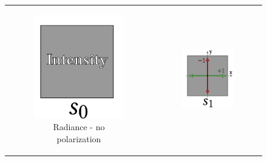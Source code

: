 \renewcommand\thesubfigure{\arabic{subfigure}}
\begin{figure}
	\centering
	\begin{tabular}{cc}
		\begin{subfigure}
			{0.4\textwidth}\centering\includegraphics[width=\linewidth]{img/stokes1.png}
			\caption{Radiance - no polarization}
		\end{subfigure}
		&
		\begin{subfigure}
			{0.4\textwidth}\centering\includegraphics[width=\linewidth]{img/stokes2.png}

\end{subfigure}
\end{tabular}
\end{figure}
